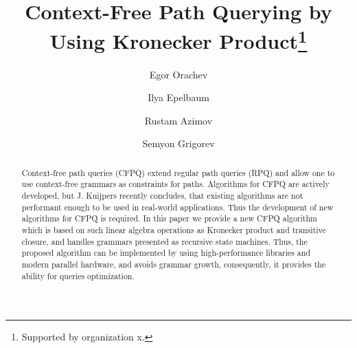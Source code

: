 \documentclass[runningheads,table]{llncs}
\begin{document}
%
\title{Context-Free Path Querying by Using Kronecker Product\thanks{Supported by organization x.}}
%
%
\author{Egor Orachev \and
Ilya Epelbaum \and
Rustam Azimov \and
Semyon Grigorev}
%
%
%
\maketitle              %
%
\begin{abstract}
Context-free path queries (CFPQ) extend regular path queries (RPQ) and allow one to use context-free grammars as constraints for paths. Algorithms for CFPQ are actively developed, but J. Kuijpers recently concludes, that existing algorithms are not performant enough to be used in real-world applications. Thus the development of new algorithms for CFPQ is required. In this paper we provide a new CFPQ algorithm which is based on such linear algebra operations as Kronecker product and transitive closure, and handles grammars presented as recursive state machines. Thus, the proposed algorithm can be implemented by using high-performance libraries and modern parallel hardware, and avoids grammar growth, consequently, it provides the ability for queries optimization.


\end{abstract}
%
%
%







%
%
%
 
 
\end{document}
